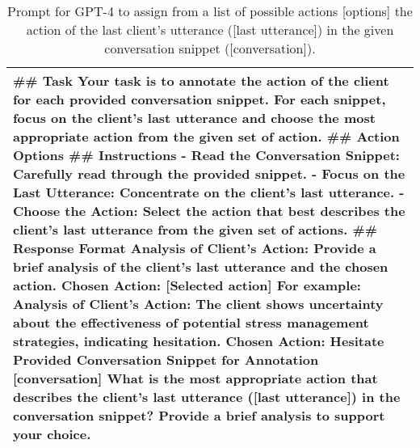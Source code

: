 \begin{table*}[tb]
\begin{tabularx}{\textwidth}{X}
\toprule
\#\# Task \newline Your task is to annotate the action of the client for each provided conversation snippet. For each snippet, focus on the client's last utterance and choose the most appropriate action from the given set of action. \newline  \#\# Action Options \newline [options] \newline \#\# Instructions \newline - Read the Conversation Snippet: Carefully read through the provided snippet. \newline - Focus on the Last Utterance: Concentrate on the client's last utterance. \newline - Choose the Action: Select the action that best describes the client's last utterance from the given set of actions. \newline  \#\# Response Format \newline Analysis of Client's Action: Provide a brief analysis of the client's last utterance and the chosen action. \newline Chosen Action: [Selected action] \newline For example: \newline Analysis of Client's Action: The client shows uncertainty about the effectiveness of potential stress management strategies, indicating hesitation.  \newline Chosen Action: Hesitate  \newline Provided Conversation Snippet for Annotation [conversation]  \newline What is the most appropriate action that describes the client's last utterance ([last utterance]) in the conversation snippet? Provide a brief analysis to support your choice.
\\ \bottomrule
\end{tabularx}
\caption{Prompt for GPT-4 to assign  from a list of possible actions [options] the action of the last client's utterance ([last utterance]) in the given conversation snippet ([conversation]).}
\label{tab:action annotation}
\end{table*}


